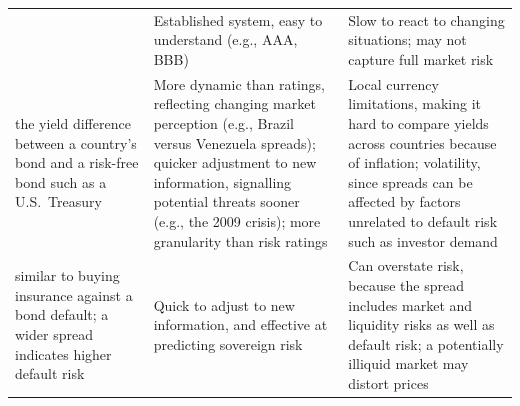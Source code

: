 
\begin{center}
\footnotesize
\begin{tabular}{L{2.7cm} L{5.7cm} L{6.1cm}}
\toprule
{} &  &  \\
\midrule
{} &
  Established system, easy to understand (e.g., AAA, BBB) &
  Slow to react to changing situations; may not capture full market risk \\
 \newline
  {\scriptsize the yield difference between a country's bond and a risk-free
  bond such as a U.S.\ Treasury} &
  More dynamic than ratings, reflecting changing market perception (e.g., Brazil
  versus Venezuela spreads); quicker adjustment to new information, signalling
  potential threats sooner (e.g., the 2009 crisis); more granularity than risk
  ratings &
  Local currency limitations, making it hard to compare yields across countries
  because of inflation; volatility, since spreads can be affected by factors
  unrelated to default risk such as investor demand \\
 \newline
  {\scriptsize similar to buying insurance against a bond default; a wider spread
  indicates higher default risk} &
  Quick to adjust to new information, and effective at predicting sovereign risk &
  Can overstate risk, because the spread includes market and liquidity risks as
  well as default risk; a potentially illiquid market may distort prices \\
\bottomrule
\end{tabular}
\end{center}
